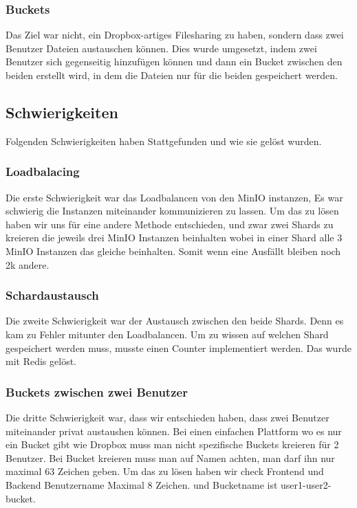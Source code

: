 \documentclass[12pt]{report}
\begin{document}
				\subsubsection{Buckets}
				Das Ziel war nicht, ein Dropbox-artiges Filesharing zu haben, sondern dass zwei Benutzer Dateien austauschen können. Dies wurde umgesetzt, indem zwei Benutzer sich gegenseitig hinzufügen können und dann ein Bucket zwischen den beiden erstellt wird, in dem die Dateien nur für die beiden gespeichert werden.
			\subsection{Schwierigkeiten}
				Folgenden Schwierigkeiten haben Stattgefunden und wie sie gelöst wurden.
				
				\subsubsection{Loadbalacing}
					Die erste Schwierigkeit war das Loadbalancen von den MinIO instanzen, Es war schwierig die Instanzen miteinander kommunizieren zu lassen. Um das zu lösen haben wir uns für eine andere Methode entschieden, und zwar zwei Shards zu kreieren die jeweils drei MinIO Instanzen beinhalten wobei in einer Shard alle 3 MinIO Instanzen das gleiche beinhalten. Somit wenn eine Ausfällt bleiben noch 2k andere.
			
				\subsubsection{Schardaustausch}
					Die zweite Schwierigkeit war der Austausch zwischen den beide Shards. Denn es kam zu Fehler mitunter den Loadbalancen. Um zu wissen auf welchen Shard gespeichert werden muss, musste einen Counter implementiert werden. Das wurde mit Redis gelöst.
				
				\subsubsection{Buckets zwischen zwei Benutzer}
					Die dritte Schwierigkeit war, dass wir entschieden haben, dass zwei Benutzer miteinander privat austaushen können. Bei einen einfachen Plattform wo es nur ein Bucket gibt wie Dropbox muss man nicht spezifische Buckets kreieren für 2 Benutzer. Bei Bucket kreieren muss man auf Namen achten, man darf ihn nur maximal 63 Zeichen geben. Um das zu lösen haben wir check Frontend und Backend Benutzername Maximal 8 Zeichen. und Bucketname ist user1-user2-bucket.
			
\end{document}

